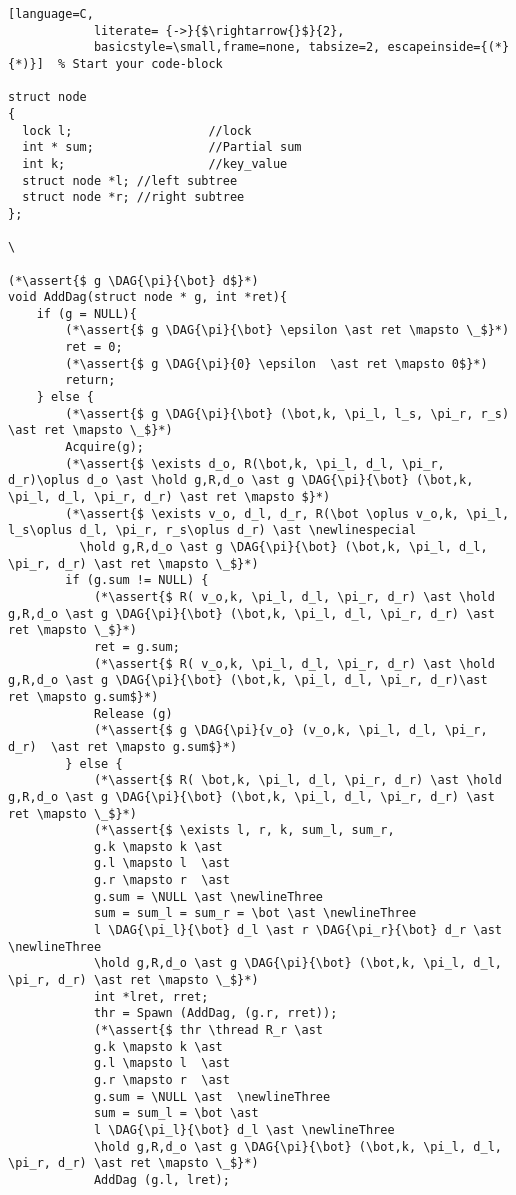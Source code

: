 \documentclass[8pt]{article}
\newcommand{\thread}{\ocircle \hspace{-1ex} \rightarrow}
\newcommand{\hold}{\text{Hold }}
\newcommand{\assert}[1]{\textcolor{blue}{ \{ #1 \}  } }
\newcommand{\NULL}{\text{NULL }}
\newcommand{\newlinespecial}{\newline \hphantom{100pt}}
\newcommand{\newlineThree}{\newline \hphantom{100pt}\hphantom{100pt}}
\newcommand{\DAG}[2]{ \underset{#2}{\overset{#1}{\dag}} }
\begin{document}
\begin{lstlisting}[language=C,
			literate= {->}{$\rightarrow{}$}{2},
			basicstyle=\small,frame=none, tabsize=2, escapeinside={(*}{*)}]  % Start your code-block

struct node
{
  lock l;					//lock          
  int * sum;				//Partial sum
  int k;					//key_value
  struct node *l; //left subtree
  struct node *r; //right subtree
};

\

(*\assert{$ g \DAG{\pi}{\bot} d$}*)
void AddDag(struct node * g, int *ret){
	if (g = NULL){
		(*\assert{$ g \DAG{\pi}{\bot} \epsilon \ast ret \mapsto \_$}*)
		ret = 0;
		(*\assert{$ g \DAG{\pi}{0} \epsilon  \ast ret \mapsto 0$}*)
		return;
	} else {
		(*\assert{$ g \DAG{\pi}{\bot} (\bot,k, \pi_l, l_s, \pi_r, r_s) \ast ret \mapsto \_$}*)
		Acquire(g);
		(*\assert{$ \exists d_o, R(\bot,k, \pi_l, d_l, \pi_r, d_r)\oplus d_o \ast \hold g,R,d_o \ast g \DAG{\pi}{\bot} (\bot,k, \pi_l, d_l, \pi_r, d_r) \ast ret \mapsto $}*)
		(*\assert{$ \exists v_o, d_l, d_r, R(\bot \oplus v_o,k, \pi_l, l_s\oplus d_l, \pi_r, r_s\oplus d_r) \ast \newlinespecial
		  \hold g,R,d_o \ast g \DAG{\pi}{\bot} (\bot,k, \pi_l, d_l, \pi_r, d_r) \ast ret \mapsto \_$}*)
		if (g.sum != NULL) {
			(*\assert{$ R( v_o,k, \pi_l, d_l, \pi_r, d_r) \ast \hold g,R,d_o \ast g \DAG{\pi}{\bot} (\bot,k, \pi_l, d_l, \pi_r, d_r) \ast ret \mapsto \_$}*)
			ret = g.sum;
			(*\assert{$ R( v_o,k, \pi_l, d_l, \pi_r, d_r) \ast \hold g,R,d_o \ast g \DAG{\pi}{\bot} (\bot,k, \pi_l, d_l, \pi_r, d_r)\ast ret \mapsto g.sum$}*)
			Release (g)
			(*\assert{$ g \DAG{\pi}{v_o} (v_o,k, \pi_l, d_l, \pi_r, d_r)  \ast ret \mapsto g.sum$}*)
		} else {
			(*\assert{$ R( \bot,k, \pi_l, d_l, \pi_r, d_r) \ast \hold g,R,d_o \ast g \DAG{\pi}{\bot} (\bot,k, \pi_l, d_l, \pi_r, d_r) \ast ret \mapsto \_$}*)
			(*\assert{$ \exists l, r, k, sum_l, sum_r,
			g.k \mapsto k \ast
			g.l \mapsto l  \ast
			g.r \mapsto r  \ast
			g.sum = \NULL \ast \newlineThree
			sum = sum_l = sum_r = \bot \ast \newlineThree
			l \DAG{\pi_l}{\bot} d_l \ast r \DAG{\pi_r}{\bot} d_r \ast \newlineThree
			\hold g,R,d_o \ast g \DAG{\pi}{\bot} (\bot,k, \pi_l, d_l, \pi_r, d_r) \ast ret \mapsto \_$}*)
			int *lret, rret;
			thr = Spawn (AddDag, (g.r, rret));
			(*\assert{$ thr \thread R_r \ast
			g.k \mapsto k \ast
			g.l \mapsto l  \ast
			g.r \mapsto r  \ast
			g.sum = \NULL \ast  \newlineThree
			sum = sum_l = \bot \ast 
			l \DAG{\pi_l}{\bot} d_l \ast \newlineThree
			\hold g,R,d_o \ast g \DAG{\pi}{\bot} (\bot,k, \pi_l, d_l, \pi_r, d_r) \ast ret \mapsto \_$}*)
			AddDag (g.l, lret);

\end{lstlisting}
\end{document}
